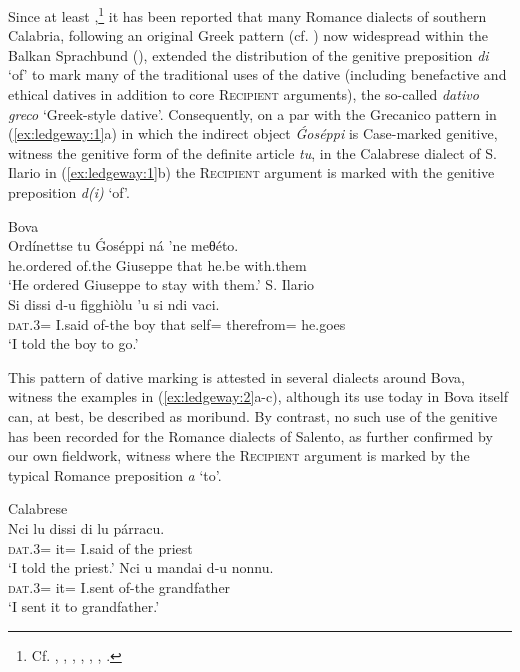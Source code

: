 \documentclass[output=paper,modfonts,nonflat,colorlinks,citecolor=brown]{langsci/langscibook}
\begin{document}
Since at least \citet[§639]{Rohlfs1969},\footnote{Cf. \citet[§639]{Rohlfs1969}, \citet[232-233]{Trumper2003}, \citet[209]{Vincent1997}, \citet[243, 427-429]{Katsoyannou1995}, \citet[54-55]{Katsoyannou2001}, \citet[140-141]{Ralli2006}, \citet[192-196]{Ledgeway2013}.} it has been reported that many Romance dialects of southern Calabria, following an original Greek pattern (cf. \citealt[160]{Joseph1990}) now widespread within the Balkan Sprachbund (\citealt[187]{Sandfeld1930, Pompeo2012}), extended the distribution of the genitive preposition \textit{di} ‘of’ to mark many of the traditional uses of the dative (including benefactive and ethical datives in addition to core \textsc{Recipient} arguments), the so-called \textit{dativo greco} `Greek-style dative'. Consequently, on a par with the Grecanico pattern in (\ref{ex:ledgeway:1}a) in which the indirect object \textit{Ǵoséppi} is Case-marked genitive, witness the genitive form of the definite article \textit{tu}, in the Calabrese dialect of S. Ilario in (\ref{ex:ledgeway:1}b) the \textsc{Recipient} argument is marked with the genitive preposition \textit{d(i)} ‘of’. 

\ea\label{ex:ledgeway:1}
\ea  Bova  \\
  \gll Ordínettse  tu  Ǵoséppi  ná  ’ne  meθéto.\\  
    he.ordered  of.the  Giuseppe  that  he.be  with.them\\
    \glt `He ordered Giuseppe to stay with them.'
  \ex S. Ilario\\
    \gll Si  dissi  d-u  figghiòlu  ’u  si  ndi  vaci.\\ 
    \textsc{dat}.3=  I.said  of-the  boy  that  self=  therefrom=  he.goes \\
    \glt `I told the boy to go.'
    \z
    \z
    

This pattern of dative marking is attested in several dialects around Bova, witness the examples in (\ref{ex:ledgeway:2}a-c), although its use today in Bova itself can, at best, be described as moribund. By contrast, no such use of the genitive has been recorded for the Romance dialects of Salento, as further confirmed by our own fieldwork, witness  where the \textsc{Recipient} argument is marked by the typical Romance preposition \textit{a} ‘to’.

\ea\label{ex:ledgeway:2}
Calabrese  \\
\ea
	\gll Nci  lu  dissi  di  lu  párracu.\\
    \textsc{dat}.3=   it=  I.said  of  the  priest\\
    \glt `I told the priest.'
 \ex \gll Nci  u  mandai  d-u  nonnu.  \\
    \textsc{dat}.3=  it=  I.sent  of-the  grandfather\\
    \glt `I sent it to grandfather.'
    
\end{document}
